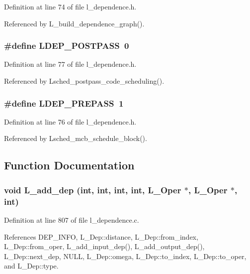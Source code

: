 Definition at line 74 of file l\_\-dependence.h.

Referenced by L\_\-build\_\-dependence\_\-graph().
\subsubsection{\setlength{\rightskip}{0pt plus 5cm}\#define LDEP\_\-POSTPASS~0}\label{l__dependence_8h_27474e7ed5ec0830f2bbd60326758c68}




Definition at line 77 of file l\_\-dependence.h.

Referenced by Lsched\_\-postpass\_\-code\_\-scheduling().
\subsubsection{\setlength{\rightskip}{0pt plus 5cm}\#define LDEP\_\-PREPASS~1}\label{l__dependence_8h_daf2531836c0a433be76cc3530568278}




Definition at line 76 of file l\_\-dependence.h.

Referenced by Lsched\_\-mcb\_\-schedule\_\-block().

\subsection{Function Documentation}
\subsubsection{\setlength{\rightskip}{0pt plus 5cm}void L\_\-add\_\-dep (int, int, int, int, L\_\-Oper $\ast$, L\_\-Oper $\ast$, int)}\label{l__dependence_8h_1a7647b8ab91e39718b42ca94a936a33}




Definition at line 807 of file l\_\-dependence.c.

References DEP\_\-INFO, L\_\-Dep::distance, L\_\-Dep::from\_\-index, L\_\-Dep::from\_\-oper, L\_\-add\_\-input\_\-dep(), L\_\-add\_\-output\_\-dep(), L\_\-Dep::next\_\-dep, NULL, L\_\-Dep::omega, L\_\-Dep::to\_\-index, L\_\-Dep::to\_\-oper, and L\_\-Dep::type.

